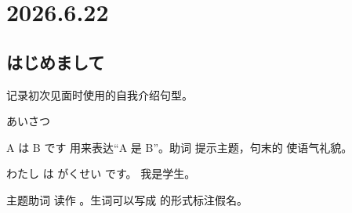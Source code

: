 \section{2026.6.22}

\subsection*{はじめまして}

\begin{studygoal}[今日のメモ]
  记录初次见面时使用的自我介绍句型。
\end{studygoal}

\begin{vocab}{あいさつ}
\end{vocab}

\begin{grammar}{A は B です}
  用来表达“A 是 B”。助词  提示主题，句末的
   使语气礼貌。
\end{grammar}

\begin{example}
    {わたし は がくせい です。}
    {我是学生。}
\end{example}

\begin{pitfall}[读音提醒]
  主题助词  读作 。生词可以写成
   的形式标注假名。
\end{pitfall}

